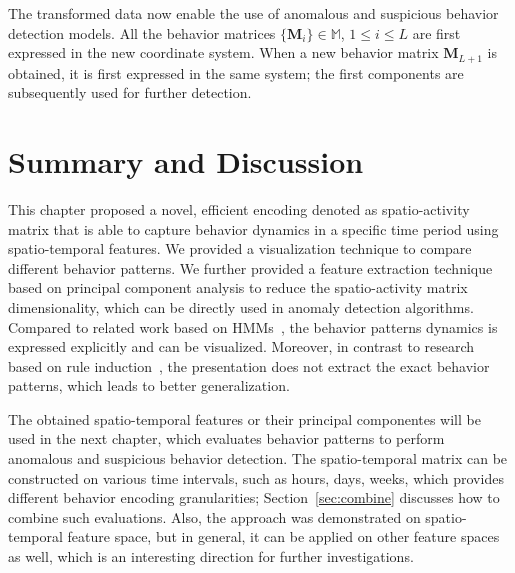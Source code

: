The transformed data now enable the use of anomalous and suspicious behavior detection models. All the behavior matrices $\{\mathbf{M}_i\} \in \mathbb{M}$, $1 \leq i \leq L$ are first expressed in the new coordinate system. When a new behavior matrix $\mathbf{M}_{L+1}$ is obtained, it is first expressed in the same system; the first components are subsequently used for further detection.


%
%

\section{Summary and Discussion}
This chapter proposed a novel, efficient encoding denoted as spatio-activity matrix that is able to capture behavior dynamics in a specific time period using spatio-temporal features. We provided a visualization technique to compare different behavior patterns. We further provided a feature extraction technique based on principal component analysis to reduce the spatio-activity matrix dimensionality, which can be directly used in anomaly detection algorithms. Compared to related work based on HMMs~\citep{Monekosso}, the behavior patterns dynamics is expressed explicitly and can be visualized. Moreover, in contrast to research based on rule induction~\citep{Lee04daily,Lymberopoulos}, the presentation does not extract the exact behavior patterns, which leads to better generalization.

The obtained spatio-temporal features or their principal componentes will be used in the next chapter, which evaluates behavior patterns to perform anomalous and suspicious behavior detection. The spatio-temporal matrix can be constructed on various time intervals, such as hours, days, weeks, which provides different behavior encoding granularities; Section~\ref{sec:combine} discusses how to combine such evaluations. Also, the approach was demonstrated on spatio-temporal feature space, but in general, it can be applied on other feature spaces as well, which is an interesting direction for further investigations.

%




